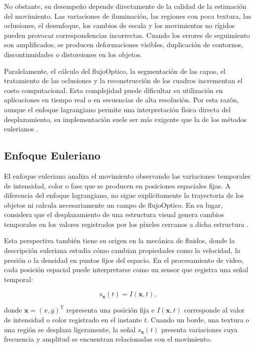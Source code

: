 No obstante, su desempeño depende directamente de la calidad de la estimación del movimiento. Las variaciones de iluminación, las regiones con poca textura, las oclusiones, el desenfoque, los cambios de escala y los movimientos no rígidos pueden provocar correspondencias incorrectas. Cuando los errores de seguimiento son amplificados, se producen deformaciones visibles, duplicación de contornos, discontinuidades o distorsiones en los objetos.

Paralelamente, el cálculo del \gls{flujoOptico}, la segmentación de las capas, el tratamiento de las oclusiones y la reconstrucción de los cuadros incrementan el costo computacional. Esta complejidad puede dificultar su utilización en aplicaciones en tiempo real o en secuencias de alta resolución. Por esta razón, aunque el enfoque lagrangiano permite una interpretación física directa del desplazamiento, su implementación suele ser más exigente que la de los métodos eulerianos \cite{ahmed2023overview}.
\subsection{Enfoque Euleriano}
\label{subsubsec:enfoque_euleriano}

El enfoque euleriano analiza el movimiento observando las variaciones temporales de intensidad, color o fase que se producen en posiciones espaciales fijas. A diferencia del enfoque lagrangiano, no sigue explícitamente la trayectoria de los objetos ni calcula necesariamente un campo de \gls{flujoOptico}. En su lugar, considera que el desplazamiento de una estructura visual genera cambios temporales en los valores registrados por los píxeles cercanos a dicha estructura \cite{wu2012eulerian,ahmed2023overview}.

Esta perspectiva también tiene su origen en la mecánica de fluidos, donde la descripción euleriana estudia cómo cambian propiedades como la velocidad, la presión o la densidad en puntos fijos del espacio. En el procesamiento de video, cada posición espacial puede interpretarse como un sensor que registra una señal temporal:

\begin{equation}
    s_{\mathbf{x}}(t)=I(\mathbf{x},t),
    \label{eq:senal_temporal_euleriana}
\end{equation}

donde $\mathbf{x}=(x,y)^{\mathrm{T}}$ representa una posición fija e $I(\mathbf{x},t)$ corresponde al valor de intensidad o color registrado en el instante $t$. Cuando un borde, una textura o una región se desplaza ligeramente, la señal $s_{\mathbf{x}}(t)$ presenta variaciones cuya frecuencia y amplitud se encuentran relacionadas con el movimiento.

